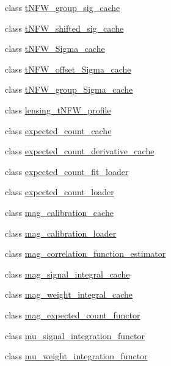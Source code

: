 \begin{DoxyCompactItemize}
\item 
class \hyperlink{classIceBRG_1_1tNFW__group__sig__cache}{t\-N\-F\-W\-\_\-group\-\_\-sig\-\_\-cache}
\item 
class \hyperlink{classIceBRG_1_1tNFW__shifted__sig__cache}{t\-N\-F\-W\-\_\-shifted\-\_\-sig\-\_\-cache}
\item 
class \hyperlink{classIceBRG_1_1tNFW__Sigma__cache}{t\-N\-F\-W\-\_\-\-Sigma\-\_\-cache}
\item 
class \hyperlink{classIceBRG_1_1tNFW__offset__Sigma__cache}{t\-N\-F\-W\-\_\-offset\-\_\-\-Sigma\-\_\-cache}
\item 
class \hyperlink{classIceBRG_1_1tNFW__group__Sigma__cache}{t\-N\-F\-W\-\_\-group\-\_\-\-Sigma\-\_\-cache}
\item 
class \hyperlink{classIceBRG_1_1lensing__tNFW__profile}{lensing\-\_\-t\-N\-F\-W\-\_\-profile}
\item 
class \hyperlink{classIceBRG_1_1expected__count__cache}{expected\-\_\-count\-\_\-cache}
\item 
class \hyperlink{classIceBRG_1_1expected__count__derivative__cache}{expected\-\_\-count\-\_\-derivative\-\_\-cache}
\item 
class \hyperlink{classIceBRG_1_1expected__count__fit__loader}{expected\-\_\-count\-\_\-fit\-\_\-loader}
\item 
class \hyperlink{classIceBRG_1_1expected__count__loader}{expected\-\_\-count\-\_\-loader}
\item 
class \hyperlink{classIceBRG_1_1mag__calibration__cache}{mag\-\_\-calibration\-\_\-cache}
\item 
class \hyperlink{classIceBRG_1_1mag__calibration__loader}{mag\-\_\-calibration\-\_\-loader}
\item 
class \hyperlink{classIceBRG_1_1mag__correlation__function__estimator}{mag\-\_\-correlation\-\_\-function\-\_\-estimator}
\item 
class \hyperlink{classIceBRG_1_1mag__signal__integral__cache}{mag\-\_\-signal\-\_\-integral\-\_\-cache}
\item 
class \hyperlink{classIceBRG_1_1mag__weight__integral__cache}{mag\-\_\-weight\-\_\-integral\-\_\-cache}
\item 
class \hyperlink{classIceBRG_1_1mag__expected__count__functor}{mag\-\_\-expected\-\_\-count\-\_\-functor}
\item 
class \hyperlink{classIceBRG_1_1mu__signal__integration__functor}{mu\-\_\-signal\-\_\-integration\-\_\-functor}
\item 
class \hyperlink{classIceBRG_1_1mu__weight__integration__functor}{mu\-\_\-weight\-\_\-integration\-\_\-functor}

\end{DoxyCompactItemize}
